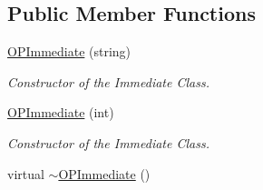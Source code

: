 \subsection*{Public Member Functions}
\begin{DoxyCompactItemize}
\item 
\hypertarget{classOPImmediate_ab047dac5f3390947a21e4ab118c05857}{
\hyperlink{classOPImmediate_ab047dac5f3390947a21e4ab118c05857}{OPImmediate} (string)}
\label{classOPImmediate_ab047dac5f3390947a21e4ab118c05857}

\begin{DoxyCompactList}\small\item\em Constructor of the Immediate Class. \item\end{DoxyCompactList}\item 
\hypertarget{classOPImmediate_ae940dcf9e9050227a94c759a0cae6861}{
\hyperlink{classOPImmediate_ae940dcf9e9050227a94c759a0cae6861}{OPImmediate} (int)}
\label{classOPImmediate_ae940dcf9e9050227a94c759a0cae6861}

\begin{DoxyCompactList}\small\item\em Constructor of the Immediate Class. \item\end{DoxyCompactList}\item 
\hypertarget{classOPImmediate_af7f51ae61e075e02817d6ecd7441408f}{
virtual \hyperlink{classOPImmediate_af7f51ae61e075e02817d6ecd7441408f}{$\sim$OPImmediate} ()}
\label{classOPImmediate_af7f51ae61e075e02817d6ecd7441408f}


\end{DoxyCompactItemize}
